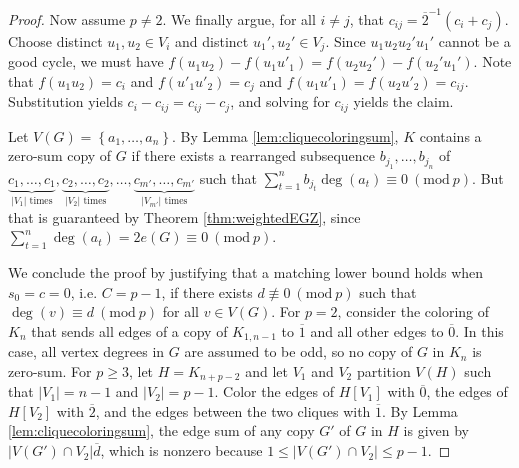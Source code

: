 \documentclass[11pt]{article}
\newcommand\set[1]{\left\{ #1 \right\}}
\newcommand\abs[1]{\left\lvert #1 \right\rvert}
\newcommand\mmod[1]{\ (\mathrm{mod}\ #1)}
\theoremstyle{definition}
\theoremstyle{plain}
\begin{document}
\begin{proof}
    Now assume $p\neq 2$. We finally argue, for all $i\neq j$, that $c_{ij}=\overline{2}^{-1}(c_i+c_j)$. Choose distinct $u_1,u_2\in V_i$ and distinct $u_1',u_2'\in V_j$. Since $u_1u_2u_2'u_1'$ cannot be a good cycle, we must have $f(u_1u_2)-f(u_1u'_1)=f(u_2u_2')-f(u_2'u_1')$. Note that $f(u_1u_2)=c_i$ and $f(u'_1u'_2)=c_j$ and $f(u_1u'_1)=f(u_2u'_2)=c_{ij}$. Substitution yields $c_i-c_{ij}=c_{ij}-c_j$, and solving for $c_{ij}$ yields the claim. 
    
    Let $V(G)=\set{a_1,\ldots,a_n}$. By Lemma \ref{lem:cliquecoloringsum}, $K$ contains a zero-sum copy of $G$ if there exists a rearranged subsequence $b_{j_1},\ldots,b_{j_{n}}$ of $\underbrace{c_1,\dots,c_1}_{\abs{V_1} \text{ times}},\underbrace{c_2,\dots,c_2}_{\abs{V_2} \text{ times}},\dots,\underbrace{c_{m'},\dots,c_{m'}}_{\abs{V_{m'}} \text{ times}}$ such that $\sum_{t=1}^{n}b_{j_t}\deg(a_t)\equiv 0\mmod{p}$. But that is guaranteed by Theorem \ref{thm:weightedEGZ}, since $\sum_{t=1}^{n}\deg(a_t)=2e(G)\equiv 0\mmod{p}$.

    We conclude the proof by justifying that a matching lower bound holds when $s_0=c=0$, i.e. $C=p-1$, if there exists $d\not\equiv 0\mmod{p}$ such that $\deg(v)\equiv d\mmod{p}$ for all $v\in V(G)$. For $p=2$, consider the coloring of $K_{n}$ that sends all edges of a copy of $K_{1,n-1}$ to $\overline{1}$ and all other edges to $\overline{0}$. In this case, all vertex degrees in $G$ are assumed to be odd, so no copy of $G$ in $K_n$ is zero-sum. For $p\geq 3$, let $H=K_{n+p-2}$ and let $V_1$ and $V_2$ partition $V(H)$ such that $\abs{V_1}=n-1$ and $\abs{V_2}=p-1$. Color the edges of $H[V_1]$ with $\overline{0}$, the edges of $H[V_2]$ with $\overline{2}$, and the edges between the two cliques with $\overline{1}$. By Lemma \ref{lem:cliquecoloringsum}, the edge sum of any copy $G'$ of $G$ in $H$ is given by $\abs{V(G')\cap V_2}\overline{d}$, which is nonzero because $1\leq \abs{V(G')\cap V_2}\leq p-1$.
\end{proof}



\end{document}
